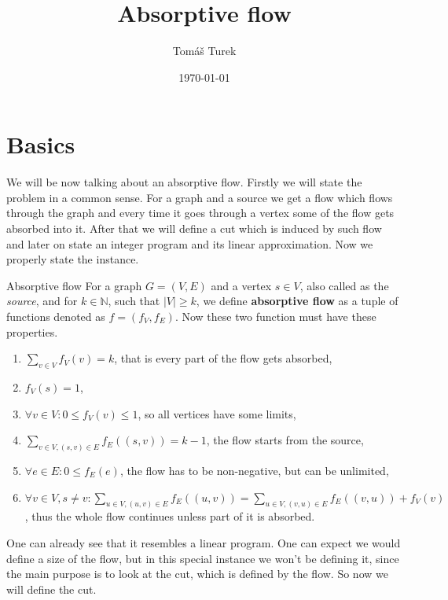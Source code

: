 \documentclass{article}
\title{Absorptive flow}
\author{Tomáš Turek}
\date{\today}
\begin{document}
	\maketitle
	
	\section{Basics}
	
	We will be now talking about an absorptive flow. Firstly we will state the problem in a common sense. For a graph and a source we get a flow which flows through the graph and every time it goes through a vertex some of the flow gets absorbed into it. After that we will define a cut which is induced by such flow and later on state an integer program and its linear approximation. Now we properly state the instance.
	
	\begin{defn}{Absorptive flow}
		For a graph $G = (V,E)$ and a vertex $s \in V$, also called as the \textit{source}, and for $k \in \mathbb{N}$, such that $|V| \geq k$, we define \textbf{absorptive flow} as a tuple of functions denoted as $f = (f_V, f_E)$. Now these two function must have these properties.
		
		\begin{enumerate}
			\item $\sum_{v \in V} f_V (v) = k$, that is every part of the flow gets absorbed,
			\item $f_V(s) = 1$,
			\item $\forall v \in V : 0 \leq f_V(v) \leq 1$, so all vertices have some limits,
			\item $\sum_{v \in V, (s,v) \in E} f_E((s,v)) = k-1$, the flow starts from the source,
			\item $\forall e \in E : 0 \leq f_E(e)$, the flow has to be non-negative, but can be unlimited,
			\item $\forall v \in V, s \neq v : \sum_{u \in V, (u,v) \in E} f_E((u,v)) = \sum_{u \in V, (v,u) \in E} f_E((v,u)) + f_V(v)$, thus the whole flow continues unless part of it is absorbed.
		\end{enumerate}
	\end{defn}
	
	One can already see that it resembles a linear program. One can expect we would define a size of the flow, but in this special instance we won't be defining it, since the main purpose is to look at the cut, which is defined by the flow. So now we will define the cut.
	
\end{document}
